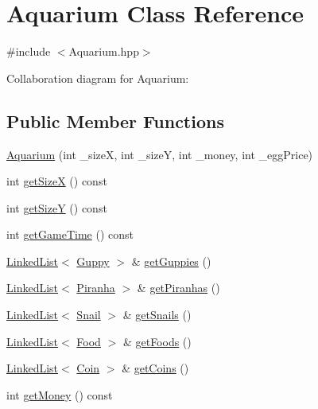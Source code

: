 \hypertarget{class_aquarium}{}\section{Aquarium Class Reference}
\label{class_aquarium}


{\ttfamily \#include $<$Aquarium.\+hpp$>$}



Collaboration diagram for Aquarium\+:
\subsection*{Public Member Functions}
\begin{DoxyCompactItemize}
\item 
\mbox{\hyperlink{class_aquarium_a62a4dae7e6f07cb1b753ac87c0dd90e0}{Aquarium}} (int \+\_\+sizeX, int \+\_\+sizeY, int \+\_\+money, int \+\_\+egg\+Price)
\item 
int \mbox{\hyperlink{class_aquarium_ab81986af33708a95c309a10a0f317058}{get\+SizeX}} () const
\item 
int \mbox{\hyperlink{class_aquarium_a0384a8e32a1e61baf38e09925ffaed96}{get\+SizeY}} () const
\item 
int \mbox{\hyperlink{class_aquarium_aac0206880d410aec571cfc10b8ceae46}{get\+Game\+Time}} () const
\item 
\mbox{\hyperlink{class_linked_list}{Linked\+List}}$<$ \mbox{\hyperlink{class_guppy}{Guppy}} $>$ \& \mbox{\hyperlink{class_aquarium_a9214dfeb37c333eb3f95f8fc50adb933}{get\+Guppies}} ()
\item 
\mbox{\hyperlink{class_linked_list}{Linked\+List}}$<$ \mbox{\hyperlink{class_piranha}{Piranha}} $>$ \& \mbox{\hyperlink{class_aquarium_af6c1da11d3952590634655e81d9a4eba}{get\+Piranhas}} ()
\item 
\mbox{\hyperlink{class_linked_list}{Linked\+List}}$<$ \mbox{\hyperlink{class_snail}{Snail}} $>$ \& \mbox{\hyperlink{class_aquarium_adae17992a9b26d6918b96159a929d3eb}{get\+Snails}} ()
\item 
\mbox{\hyperlink{class_linked_list}{Linked\+List}}$<$ \mbox{\hyperlink{class_food}{Food}} $>$ \& \mbox{\hyperlink{class_aquarium_a919dd5ccffd5fe1469544c74b5f26ee7}{get\+Foods}} ()
\item 
\mbox{\hyperlink{class_linked_list}{Linked\+List}}$<$ \mbox{\hyperlink{class_coin}{Coin}} $>$ \& \mbox{\hyperlink{class_aquarium_a2524ad6a6a267f58251a9edc514fab53}{get\+Coins}} ()
\item 
int \mbox{\hyperlink{class_aquarium_a313caeabfcd5936c3982a6642b5c7e2f}{get\+Money}} () const

\end{DoxyCompactItemize}
